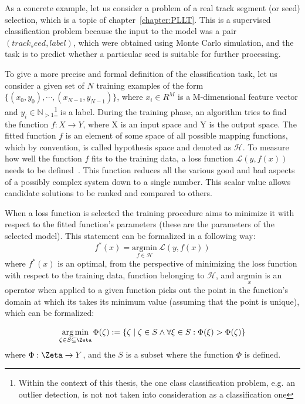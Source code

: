 As a concrete example, let us consider a problem of a real track segment (or seed) selection, which is a topic of chapter~\ref{chapter:PLLT}. This is a supervised classification problem because the input to the model was a pair $(track_seed, label)$, which were obtained using Monte Carlo simulation, and the task is to predict whether a particular seed is suitable for further processing.

To give a more precise and formal definition of the classification task, let us consider a given set of $N$ training examples of the form \\ $\{(x_0,y_0), \dotsb , (x_{N-1} , y_{N-1})\}$, where $x_{i} \in R^{M}$ is a M-dimensional feature vector and $y_i \in \mathbb{N}_{>1}$\footnote{Within the context of this thesis, the one class classification problem, e.g. an outlier detection, is not not taken into consideration as a classification one} is a label. During the training phase, an algorithm tries to find the function $f: X\rightarrow Y$, where X is an input space and Y is the output space. The fitted function $f$ is an element of some space of all possible mapping functions, which by convention, is called hypothesis space and denoted as $\mathcal{H}$. To measure how well the function $f$ fits to the training data, a loss function $\mathcal{L}(y,f(x))$ needs to be defined~\cite{DLBook}. This function reduces all the various good and bad aspects of a possibly complex system down to a single number. This scalar value allows candidate solutions to be ranked and compared to others.


When a loss function is selected the training procedure aims to minimize it with respect to the fitted function's parameters (these are the parameters of the selected model). This statement can be formalized in a following way: 
\begin{equation} \label{eq:loss}
f^*(x) = \underset{f \in \mathcal{H}}{\mathrm{argmin}} ~  \mathcal{L}(y,f(x))
\end{equation}
where $f^*(x)$ is an optimal, from the perspective of minimizing the loss function with respect to the training data, function belonging to $\mathcal{H}$, and $ \underset{x}{\mathrm{argmin}}$ is an operator when applied to a given function picks out the point in the function's domain at which its takes its minimum value (assuming that the point is unique), which can be formalized:

\begin{equation}
   \underset{\zeta \in S\subseteq \Zeta}{\operatorname{arg\,min}}\, \Phi(\zeta) := \{\zeta \mid \zeta \in S \wedge \forall \xi \in S : \Phi(\xi) > \Phi(\zeta)\}
\end{equation}
where $\Phi:\Zeta \rightarrow Y$, and the $S$ is a subset where the function $\Phi$ is defined.  

